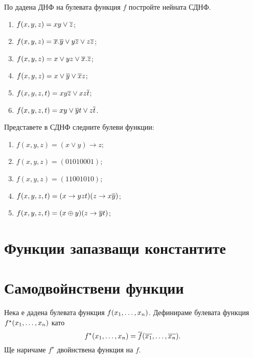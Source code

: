 \begin{problem}%
  По дадена ДНФ на булевата функция $f$ постройте нейната СДНФ.
  \begin{enumerate}[1)]
  \item
    $f(x,y,z) = xy\vee\overline{z}$;
  \item
    $f(x,y,z) = \overline{x}.\overline{y} \vee y\overline{z} \vee z\overline{z}$;
  \item
    $f(x,y,z) = x\vee yz \vee \overline{x}.\overline{z}$;
  \item
    $f(x,y,z) = x\vee \overline{y}\vee \overline{x}z$;
  \item
    $f(x,y,z,t) = xy\overline{z} \vee xz\overline{t}$;
  \item
    $f(x,y,z,t) = xy \vee \overline{y}t \vee z\overline{t}$.
  \end{enumerate}
\end{problem}

\begin{problem}
  Представете в СДНФ следните булеви функции:
  \begin{enumerate}[1)]
  \item
    $f(x,y,z) = (x\vee y)\rightarrow z$;
  \item
    $f(x,y,z) = (01010001)$;
  \item
    $f(x,y,z) = (11001010)$;
  \item
    $f(x,y,z,t) = (x\rightarrow yzt)(z\rightarrow x\overline{y})$;
  \item
    $f(x,y,z,t) = (x\oplus y)(z\rightarrow \overline{y}t)$;
  \end{enumerate}
\end{problem}

\section{Функции запазващи константите}

\section{Самодвойнствени функции}

Нека е дадена булевата функция $f(x_{1},\dots,x_{n})$. Дефинираме булевата функция $f^\star(x_{1},\dots,x_{n})$ като
\[f^\star(x_{1},\dots,x_{n}) = \overline{f}(\overline{x_1},\dots,\overline{x_n}).\]
Ще наричаме $f^\star$ двойнствена функция на $f$.

